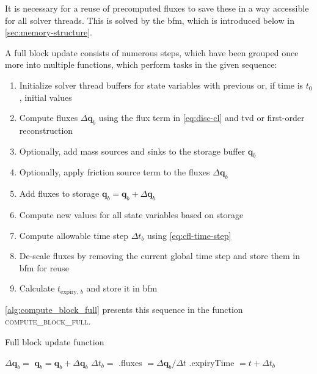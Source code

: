 It is necessary for a reuse of precomputed fluxes to save these in a way accessible for all solver threads. This is solved by the \gls{bfm}, which is introduced below in \autoref{sec:memory-structure}. 

A full block update consists of numerous steps, which have been grouped once more into multiple functions, which perform tasks in the given sequence:
\begin{enumerate}
  \item Initialize solver thread buffers for state variables with previous or, if time is $t_0$,  initial values
  \item Compute fluxes $\Delta \mathbf{q}_b$ using the flux term in \autoref{eq:disc-cl} and \gls{tvd} or first-order reconstruction
  \item Optionally, add mass sources and sinks to the storage buffer $\mathbf{q}_b$ 
  \item Optionally, apply friction source term to the fluxes $\Delta \mathbf{q}_b$
  \item Add fluxes to storage $\mathbf{q}_b = \mathbf{q}_b + \Delta \mathbf{q}_b$
  \item Compute new values for all state variables based on storage
  \item Compute allowable time step $\Delta t_b$  using \autoref{eq:cfl-time-step}
  \item De-scale fluxes by removing the current global time step and store them in \gls{bfm} for reuse
  \item Calculate $t_{\text{expiry}, \, b}$ and store it in \gls{bfm}
\end{enumerate}

\autoref{alg:compute_block_full} presents this sequence in the function \textsc{compute\_block\_full}.

\begin{algorithm} [b]
  \caption{Full block update function}
  \label{alg:compute_block_full}
  \begin{algorithmic}[1]
    \small

    \State {} 
    \State $\Delta \mathbf{q}_b =$  
    \State {} 
    \State {} 
    \State $\mathbf{q}_b = \mathbf{q}_b + \Delta \mathbf{q}_b$ 
    \State {}
    \State $\Delta t_{b} =$  
    \State {}.fluxes $= \Delta \mathbf{q}_b / \Delta t$
    \State {}.expiryTime $= t + \Delta t_{b}$ 
    \EndFunction
  \end{algorithmic}
\end{algorithm}

